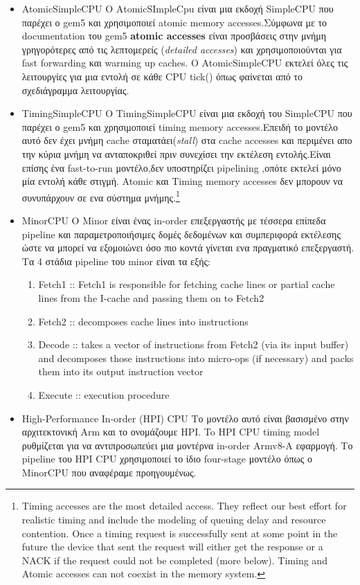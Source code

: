 \documentclass[10pt]{report}
\begin{document}
\begin{itemize}
\item AtomicSimpleCPU \newline
Ο ΑtomicSImpleCpu είναι μια εκδοχή SimpleCPU που παρέχει ο gem5 και χρησιμοποιεί atomic memory accesses.Σύμφωνα με το documentation του gem5 \textbf{atomic accesses} είναι  προσβάσεις στην μνήμη γρηγορότερες από τις λεπτομερείς (\textit{detailed accesses}) και χρησιμοποιούνται για fast forwarding και warming up caches. O AtomicSimpleCPU εκτελεί όλες τις λειτουργίες για μια εντολή σε κάθε CPU tick() όπως φαίνεται από το σχεδιάγραμμα λειτουργίας.
\item TimingSimpleCPU\newline
Ο TimingSimpleCPU είναι μια εκδοχή του SimpleCPU που παρέχει ο gem5 και χρησιμοποιεί timing memory accesses.Επειδή το μοντέλο αυτό δεν έχει μνήμη cache σταματάει(\textit{stall}) στα cache accesses και περιμένει απο την κύρια μνήμη να ανταποκριθεί πριν συνεχίσει την εκτέλεση εντολής.Είναι επίσης ένα fast-to-run μοντέλο,δεν υποστηρίζει pipelining ,οπότε εκτελεί μόνο μία εντολή κάθε στιγμή. Atomic και Timing memory accesses δεν μπορουν να συνυπάρχουν σε ενα σύστημα μνήμης.\footnote{Timing accesses are the most detailed access. They reflect our best effort for realistic timing and include the modeling of queuing delay and resource contention. Once a timing request is successfully sent at some point in the future the device that sent the request will either get the response or a NACK if the request could not be completed (more below). Timing and Atomic accesses can not coexist in the memory system.}
\item MinorCPU\newline
O Μinor είναι ένας in-order επεξεργαστής με τέσσερα επίπεδα pipeline και παραμετροποιήσιμες δομές δεδομένων και συμπεριφορά εκτέλεσης ώστε να μπορεί να εξομοιώνει όσο πιο κοντά γίνεται ενα πραγματικό επεξεργαστή. Τα 4 στάδια pipeline του minor είναι τα εξής:
\begin{enumerate}
\item Fetch1 :: Fetch1 is responsible for fetching cache lines or partial cache lines from the I-cache and passing them on to Fetch2  
\item Fetch2 ::  decomposes cache lines into instructions
\item Decode :: takes a vector of instructions from Fetch2 (via its input buffer) and decomposes those instructions into micro-ops (if necessary) and packs them into its output instruction vector
\item Execute :: execution procedure 
\end{enumerate}
\item High-Performance In-order (HPI) CPU \newline
Το μοντέλο αυτό είναι βασισμένο στην αρχιτεκτονική Arm και το ονομάζουμε HPI. To HPI CPU timing model ρυθμίζεται για να αντιπροσωπεύει μια μοντέρνα in-order Armv8-A εφαρμογή. Το pipeline του HPI CPU χρησιμοποιεί το ίδιο four-stage μοντέλο όπως ο MinorCPU που αναφέραμε προηγουμένως.
\end{itemize}
\end{document}
